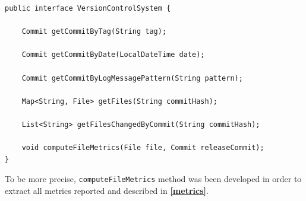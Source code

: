 \documentclass[sigconf]{acmart}
\begin{document}
\begin{lstlisting}[frame=lines,basicstyle=\ttfamily\scriptsize, caption={\texttt{VersionControlSystem} interface}, label={interface1}]
public interface VersionControlSystem {

    Commit getCommitByTag(String tag);

    Commit getCommitByDate(LocalDateTime date);

    Commit getCommitByLogMessagePattern(String pattern);

    Map<String, File> getFiles(String commitHash);

    List<String> getFilesChangedByCommit(String commitHash);

    void computeFileMetrics(File file, Commit releaseCommit);
}
\end{lstlisting}

To be more precise, \texttt{compute\-File\-Metrics} method was been developed in order to extract all metrics reported and described in \textbf{\cref{metrics}}. 
\end{document}
